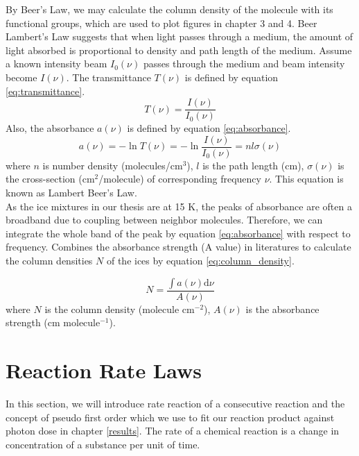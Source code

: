 By Beer’s Law, we may calculate the column density of the molecule with its functional groups, which are used to plot figures in chapter 3 and 4. Beer Lambert’s Law suggests that when light passes through a medium, the amount of light absorbed is proportional to density and path length of the medium. Assume a known intensity beam $I_{0}(\nu)$ passes through the medium and beam intensity become $I(\nu)$. The transmittance $T(\nu)$ is defined by equation \ref{eq:transmittance}. \\
\begin{equation}
T(\nu) = \frac{I(\nu)}{I_{0}(\nu)}
\label{eq:transmittance}
\end{equation}
Also, the absorbance $a(\nu)$ is defined by equation \ref{eq:absorbance}. \\
\begin{equation}
a(\nu) = - \ln T(\nu) = - \ln \frac{I(\nu)}{I_{0}(\nu)} = n l \sigma(\nu)
\label{eq:absorbance}
\end{equation}
where $n$ is number density (molecules/cm$^3$), $l$ is the path length (cm), $\sigma(\nu)$ is the cross-section (cm$^2$/molecule) of corresponding frequency $\nu$. This equation is known as Lambert Beer’s Law. \\

As the ice mixtures in our thesis are at 15 K, the peaks of absorbance are often a broadband due to coupling between neighbor molecules. Therefore, we can integrate the whole band of the peak by equation \ref{eq:absorbance} with respect to frequency. Combines the absorbance strength (A value) in literatures to calculate the column densities $N$ of the ices by equation \ref{eq:column_density}.

\begin{equation}
N = \frac{\int a(\nu) \mathrm{d}\nu}{A(\nu)}
\label{eq:column_density}
\end{equation}
where $N$ is the column density (molecule cm$^{-2}$), $A(\nu)$ is the absorbance strength (cm molecule$^{-1}$).

\section{Reaction Rate Laws}
\label{sec:Reaction_Rate_Laws}
In this section, we will introduce rate reaction of a consecutive reaction and the concept of pseudo first order which we use to fit our reaction product against photon dose in chapter \ref{results}. The rate of a chemical reaction is a change in concentration of a substance per unit of time.

